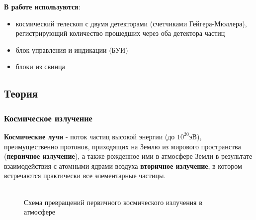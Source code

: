 \documentclass[a4paper,12pt]{article} %
\begin{document}
\textbf{В работе используются}: 
\begin{itemize}
    \item космический телескоп с двумя детекторами (счетчиками Гейгера-Мюллера), регистрирующий количество прошедших через оба детектора частиц
    \item блок управления и индикации (БУИ)
    \item блоки из свинца
\end{itemize}


\subsection{Теория}

\subsubsection{Космическое излучение}
\textbf{Космические лучи }- поток частиц высокой энергии (до $10^{20}$эВ), преимущественно протонов, приходящих на Землю из мирового пространства (\textbf{первичное излучение}), а также рожденное ими в атмосфере Земли в результате взаимодействия с атомными ядрами воздуха  \textbf{вторичное излучение}, в котором встречаются практически все элементарные частицы. \\\\
\begin{figure}[h!]
\caption{Схема превращений первичного космического излучения в атмосфере}
\label{схема}
\end{figure}
\end{document}
